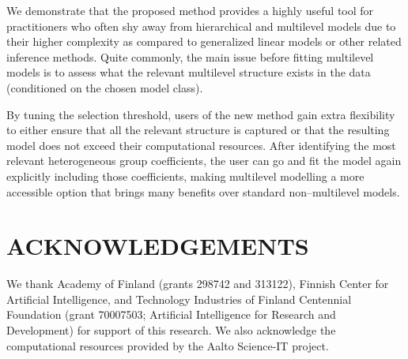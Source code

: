 \documentclass{article}
\begin{document}
We demonstrate that the proposed method provides a highly useful tool for practitioners who often shy away from hierarchical and multilevel models due to their higher complexity as compared to generalized linear models or other related inference methods.
Quite commonly, the main issue before fitting multilevel models is to assess what the relevant multilevel structure exists in the data (conditioned on the chosen model class).

By tuning the selection threshold, users of the new method gain extra flexibility to either ensure that all the relevant structure is captured or that the resulting model does not exceed their computational resources. 
After identifying the most relevant heterogeneous group coefficients, the user can go and fit the model again explicitly including those coefficients, making multilevel modelling a more accessible option that brings many benefits over standard non--multilevel models.

%
%
%
%

\section{ACKNOWLEDGEMENTS}

We thank Academy of Finland (grants 298742 and 313122),
Finnish Center for Artificial Intelligence,
and Technology Industries of Finland Centennial Foundation (grant 70007503; Artificial Intelligence for Research and Development)
for support of this research.
We also acknowledge the computational resources provided by the Aalto Science-IT project.




%
%
%
%


\end{document}
